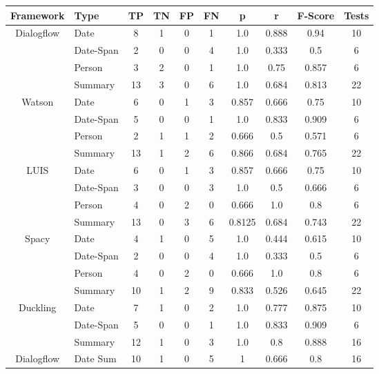 \begin{table}[h]
    \centering
    \begin{tabular}{ c | l | c | c | c | c | c | c | c | c }
        Framework & Type & TP & TN & FP & FN & p & r & F-Score & Tests \\ \hline \hline
        \multirow{4}{*}{Dialogflow} 
        & Date & 8 & 1 & 0 & 1 & 1.0 & 0.888 & 0.94 & 10 \\ 
        & Date-Span & 2 & 0 & 0 & 4 & 1.0 & 0.333 & 0.5 & 6 \\ 
        & Person & 3 & 2 & 0 & 1 & 1.0 & 0.75 & 0.857 & 6 \\ \cline{2-10}
        & Summary & 13 & 3 & 0 & 6 & 1.0 & 0.684 & 0.813 & 22 \\ \hline
        \multirow{4}{*}{Watson} 
        & Date & 6 & 0 & 1 & 3 & 0.857 & 0.666 & 0.75 & 10 \\ 
        & Date-Span & 5 & 0 & 0 & 1 & 1.0 & 0.833 & 0.909 & 6 \\ 
        & Person &  2 & 1 & 1 & 2 & 0.666 & 0.5 & 0.571 & 6 \\ \cline{2-10}
        & Summary & 13 & 1 & 2 & 6 & 0.866 & 0.684 & 0.765 & 22 \\ \hline
        \multirow{4}{*}{LUIS} 
        & Date & 6 & 0 & 1 & 3 & 0.857 & 0.666 & 0.75 & 10 \\ 
        & Date-Span & 3 & 0 & 0 & 3 & 1.0 & 0.5 & 0.666 & 6 \\ 
        & Person & 4 & 0 & 2 & 0 & 0.666 & 1.0 & 0.8 & 6 \\ \cline{2-10}
        & Summary & 13  & 0 & 3 & 6 & 0.8125 & 0.684 & 0.743 & 22 \\ \hline
        \multirow{4}{*}{Spacy} 
        & Date & 4 & 1 & 0 & 5 & 1.0 & 0.444 & 0.615 & 10 \\ 
        & Date-Span & 2 & 0 & 0 & 4 & 1.0 & 0.333 & 0.5 & 6 \\ 
        & Person & 4 & 0 & 2 & 0 & 0.666 & 1.0 & 0.8 & 6 \\ \cline{2-10}
        & Summary & 10 & 1 & 2 & 9 & 0.833 & 0.526 & 0.645 & 22 \\ \hline
        \multirow{3}{*}{Duckling} 
        & Date & 7 & 1 & 0 & 2 & 1.0 & 0.777 & 0.875 & 10 \\ 
        & Date-Span & 5 & 0 & 0 & 1 & 1.0 & 0.833 & 0.909 & 6 \\ \cline{2-10}
        & Summary & 12 & 1 & 0 & 3 & 1.0 & 0.8 & 0.888 & 16 \\ \hline
        Dialogflow & Date Sum & 10 & 1 & 0 & 5 & 1 & 0.666 & 0.8 & 16 \\ \hline

\end{tabular}
\end{table}
